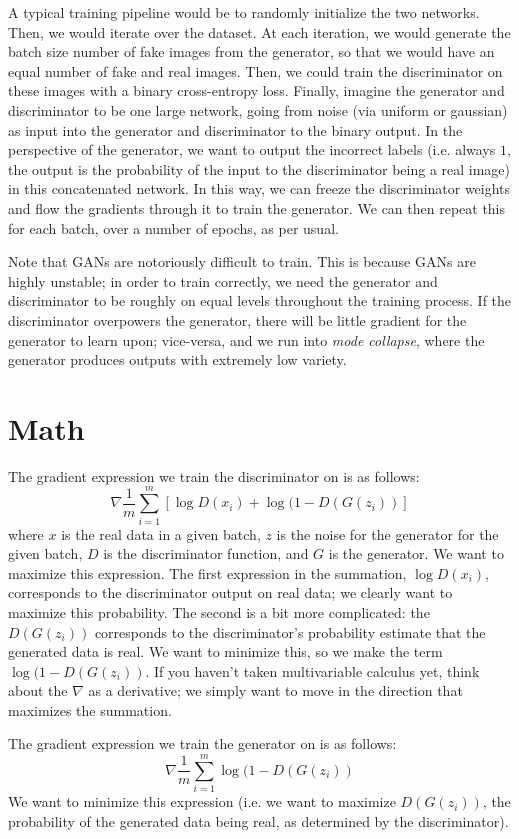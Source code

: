 \documentclass{article}
\begin{document}
    A typical training pipeline would be to randomly initialize the two networks. Then, we would iterate over the dataset. At each iteration, we would generate the batch size number of fake images from the generator, so that we would have an equal number of fake and real images. Then, we could train the discriminator on these images with a binary cross-entropy loss. Finally, imagine the generator and discriminator to be one large network, going from noise (via uniform or gaussian) as input into the generator and discriminator to the binary output. In the perspective of the generator, we want to output the incorrect labels (i.e. always $1$, the output is the probability of the input to the discriminator being a real image) in this concatenated network. In this way, we can freeze the discriminator weights and flow the gradients through it to train the generator. We can then repeat this for each batch, over a number of epochs, as per usual. 
    
    Note that GANs are notoriously difficult to train. This is because GANs are highly unstable; in order to train correctly, we need the generator and discriminator to be roughly on equal levels throughout the training process. If the discriminator overpowers the generator, there will be little gradient for the generator to learn upon; vice-versa, and we run into \textit{mode collapse}, where the generator produces outputs with extremely low variety.
\section{Math}
    The gradient expression we train the discriminator on is as follows:
    $$\nabla \frac{1}{m} \sum_{i=1}^m [\log D(x_i) + \log(1-D(G(z_i))]$$
    where $x$ is the real data in a given batch, $z$ is the noise for the generator for the given batch, $D$ is the discriminator function, and $G$ is the generator. We want to maximize this expression. The first expression in the summation, $\log D(x_i)$, corresponds to the discriminator output on real data; we clearly want to maximize this probability. The second is a bit more complicated: the $D(G(z_i))$ corresponds to the discriminator's probability estimate that the generated data is real. We want to minimize this, so we make the term $\log (1-D(G(z_i))$. If you haven't taken multivariable calculus yet, think about the $\nabla$ as a derivative; we simply want to move in the direction that maximizes the summation.
    
    The gradient expression we train the generator on is as follows:
    $$\nabla \frac{1}{m} \sum_{i=1}^m \log(1-D(G(z_i))$$
    We want to minimize this expression (i.e. we want to maximize $D(G(z_i))$, the probability of the generated data being real, as determined by the discriminator).
    
\end{document}
